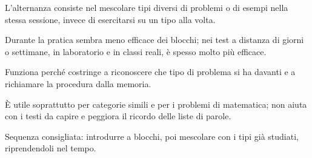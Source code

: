 \begin{sintesi}
  \item L'alternanza consiste nel mescolare tipi diversi di problemi o
        di esempi nella stessa sessione, invece di esercitarsi su un
        tipo alla volta.
  \item Durante la pratica sembra meno efficace dei blocchi; nei test
        a distanza di giorni o settimane, in laboratorio e in classi
        reali, è spesso molto più efficace.
  \item Funziona perché costringe a riconoscere che tipo di problema si
        ha davanti e a richiamare la procedura dalla memoria.
  \item È utile soprattutto per categorie simili e per i problemi di
        matematica; non aiuta con i testi da capire e peggiora il
        ricordo delle liste di parole.
  \item Sequenza consigliata: introdurre a blocchi, poi mescolare con
        i tipi già studiati, riprendendoli nel tempo.
\end{sintesi}

\finecapitolo

